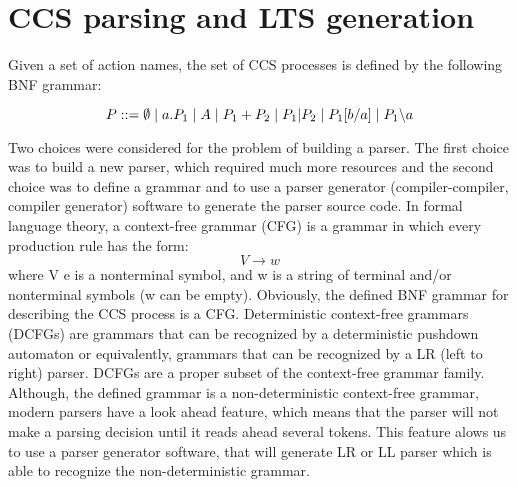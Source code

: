 \section{CCS parsing and LTS generation}

Given a set of action names, the set of CCS processes is defined by the following BNF grammar:

\begin{equation}\label{eq:ccs_bnf}
P ::= \emptyset \hspace{1 mm} | \hspace{1 mm} a.P_{1} \hspace{1 mm} | \hspace{1 mm} A \hspace{1 mm} | \hspace{1 mm}P_{1}+P_{2} \hspace{1 mm} |
\hspace{1 mm} P_{1} | P_{2} \hspace{1 mm} | \hspace{1 mm} P_{1}[b/a] \hspace{1 mm} | \hspace{1 mm} P_{1} \backslash a
\end{equation}

Two choices were considered for the problem of building a parser. The first choice was to build
a new parser, which required much more resources and the second choice was to define a grammar
and to use a parser generator (compiler-compiler, compiler generator) software to generate the parser source code.
In formal language theory, a context-free grammar (CFG) is a grammar in which every production 
rule has the form:
\[V \rightarrow w \]
where V e is a nonterminal symbol, and w is a string of terminal and/or nonterminal symbols 
(w can be empty). Obviously, the defined BNF grammar for describing the CCS process is a CFG. 
Deterministic context-free grammars (DCFGs) are grammars that can be recognized by a 
deterministic pushdown automaton or equivalently, grammars that can be recognized by a LR (left to right) parser. 
DCFGs are a proper subset of the context-free grammar family. Although, the defined grammar is 
a non-deterministic context-free grammar, modern parsers have a look ahead feature, which means that
the parser will not make a parsing decision until it reads ahead several tokens. This feature
alows us to use a parser generator software, that will generate LR or LL parser which is able to
recognize the non-deterministic grammar.

